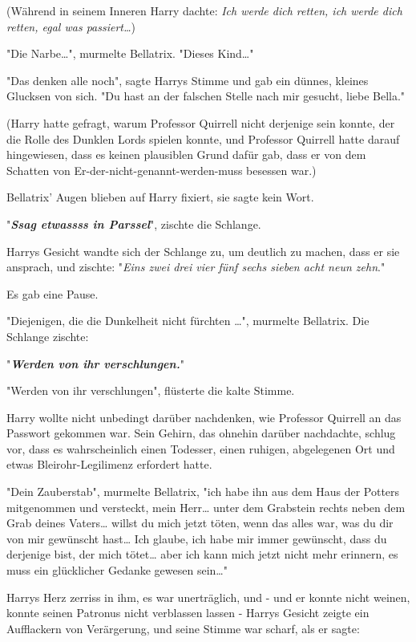 {(Während in seinem Inneren Harry dachte: \emph{Ich werde dich retten, ich werde dich retten, egal was passiert…})

"Die Narbe…", murmelte Bellatrix. "Dieses Kind…"

"Das denken alle noch", sagte Harrys Stimme und gab ein dünnes, kleines Glucksen von sich. "Du hast an der falschen Stelle nach mir gesucht, liebe Bella."

(Harry hatte gefragt, warum Professor Quirrell nicht derjenige sein konnte, der die Rolle des Dunklen Lords spielen konnte, und Professor Quirrell hatte darauf hingewiesen, dass es keinen plausiblen Grund dafür gab, dass er von dem Schatten von Er-der-nicht-genannt-werden-muss besessen war.)

Bellatrix' Augen blieben auf Harry fixiert, sie sagte kein Wort.

"\textbf{\emph{Ssag etwassss in Parssel}}", zischte die Schlange.

Harrys Gesicht wandte sich der Schlange zu, um deutlich zu machen, dass er sie ansprach, und zischte: "\emph{Eins zwei drei vier fünf sechs sieben acht neun zehn}."

Es gab eine Pause.

"Diejenigen, die die Dunkelheit nicht fürchten …", murmelte Bellatrix. Die Schlange zischte:

"\textbf{\emph{Werden von ihr verschlungen.}}"

"Werden von ihr verschlungen", flüsterte die kalte Stimme.

Harry wollte nicht unbedingt darüber nachdenken, wie Professor Quirrell an das Passwort gekommen war. Sein Gehirn, das ohnehin darüber nachdachte, schlug vor, dass es wahrscheinlich einen Todesser, einen ruhigen, abgelegenen Ort und etwas Bleirohr-Legilimenz erfordert hatte.

"Dein Zauberstab", murmelte Bellatrix, "ich habe ihn aus dem Haus der Potters mitgenommen und versteckt, mein Herr… unter dem Grabstein rechts neben dem Grab deines Vaters… willst du mich jetzt töten, wenn das alles war, was du dir von mir gewünscht hast… Ich glaube, ich habe mir immer gewünscht, dass du derjenige bist, der mich tötet… aber ich kann mich jetzt nicht mehr erinnern, es muss ein glücklicher Gedanke gewesen sein…"

Harrys Herz zerriss in ihm, es war unerträglich, und - und er konnte nicht weinen, konnte seinen Patronus nicht verblassen lassen - Harrys Gesicht zeigte ein Aufflackern von Verärgerung, und seine Stimme war scharf, als er sagte:

}
